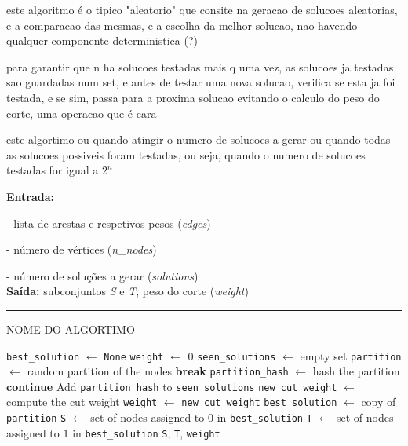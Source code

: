 \documentclass[mirror, portugues]{revdetua}
\begin{document}
este algoritmo é o tipico "aleatorio" que consite na geracao de solucoes aleatorias, e a comparacao das mesmas, e a escolha da melhor solucao, nao havendo qualquer componente deterministica (?)

para garantir que n ha solucoes testadas mais q uma vez, as solucoes ja testadas sao guardadas num set, e antes de testar uma nova solucao, verifica se esta ja foi testada, e se sim, passa para a proxima solucao evitando o calculo do peso do corte, uma operacao que é cara

este algortimo ou quando atingir o numero de solucoes a gerar ou quando todas as solucoes possiveis foram testadas, ou seja, quando o numero de solucoes testadas for igual a $2^n$

\begin{algorithm}[H]
\raggedright
\textbf{Entrada:}

- lista de arestas e respetivos pesos (\textit{edges})

- número de vértices (\textit{n\_nodes})

- número de soluções a gerar (\textit{solutions})\\
\textbf{Saída:} subconjuntos \textit{S} e \textit{T}, peso do corte (\textit{weight}) \\
\hrule 
\caption{NOME DO ALGORTIMO}
\begin{algorithmic}[1]
    \State \texttt{best\_solution} $\gets$ \texttt{None}
    \State \texttt{weight} $\gets$ 0
    \State \texttt{seen\_solutions} $\gets$ empty set
        \State \texttt{partition} $\gets$ random partition of the nodes
            \State \textbf{break}
        \EndIf
        \State \texttt{partition\_hash} $\gets$ hash the partition
            \State \textbf{continue}
        \EndIf
        \State Add \texttt{partition\_hash} to \texttt{seen\_solutions}
        \State \texttt{new\_cut\_weight} $\gets$ compute the cut weight
            \State \texttt{weight} $\gets$ \texttt{new\_cut\_weight}
            \State \texttt{best\_solution} $\gets$ copy of \texttt{partition}
        \EndIf
    \EndFor
    \State \texttt{S} $\gets$ set of nodes assigned to $0$ in \texttt{best\_solution}
    \State \texttt{T} $\gets$ set of nodes assigned to $1$ in \texttt{best\_solution}
    \Return \texttt{S}, \texttt{T}, \texttt{weight}
\end{algorithmic}
\end{algorithm}
    
\end{document}

